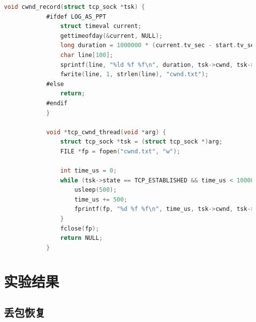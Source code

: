 \documentclass[UTF8]{report}
\begin{document}
\begin{enumerate}
    \begin{lstlisting}[language=C]
        void cwnd_record(struct tcp_sock *tsk) {
            #ifdef LOG_AS_PPT
                struct timeval current;
                gettimeofday(&current, NULL);
                long duration = 1000000 * (current.tv_sec - start.tv_sec) + current.tv_usec - start.tv_usec;
                char line[100];
                sprintf(line, "%ld %f %f\n", duration, tsk->cwnd, tsk->cwnd*TCP_MSS);
                fwrite(line, 1, strlen(line), "cwnd.txt");
            #else
                return;
            #endif
            }
            
            void *tcp_cwnd_thread(void *arg) {
                struct tcp_sock *tsk = (struct tcp_sock *)arg;
                FILE *fp = fopen("cwnd.txt", "w");
            
                int time_us = 0;
                while (tsk->state == TCP_ESTABLISHED && time_us < 1000000) {
                    usleep(500);
                    time_us += 500;
                    fprintf(fp, "%d %f %f\n", time_us, tsk->cwnd, tsk->cwnd*TCP_MSS);
                }
                fclose(fp);
                return NULL;
            }
    \end{lstlisting}
\end{enumerate}

\section{实验结果}

\subsection{丢包恢复}
\end{document}
